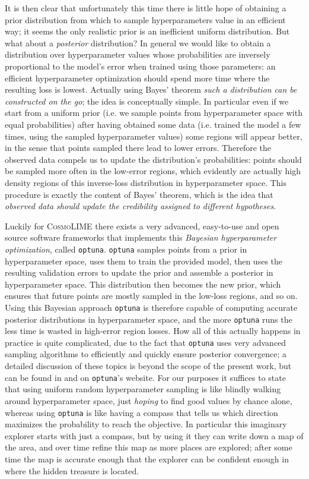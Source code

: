 It is then clear that unfortunately this time there is little hope of obtaining a prior distribution from which to sample hyperparameters value in an efficient way; it seems the only realistic prior is an inefficient uniform distribution. But what about a \emph{posterior} distribution?
In general we would like to obtain a distribution over hyperparameter values whose probabilities are inversely proportional to the model's error when trained using those parameters: an efficient hyperparameter optimization should spend more time where the resulting loss is lowest. Actually using Bayes' theorem \emph{such a distribution can be constructed on the go}; the idea is conceptually simple. In particular even if we start from a uniform prior (i.e. we sample points from hyperparameter space with equal probabilities) after having obtained some data (i.e. trained the model a few times, using the sampled hyperparameter values) some regions will appear better, in the sense that points sampled there lead to lower errors. Therefore the observed data compels us to update the distribution's probabilities: points should be sampled more often in the low-error regions, which evidently are actually high density regions of this inverse-loss distribution in hyperparameter space. This procedure is exactly the content of Bayes' theorem, which is the idea that \emph{observed data should update the credibility assigned to different hypotheses}.

Luckily for \textsc{CosmoLIME} there exists a very advanced, easy-to-use and open source software frameworks that implements this \emph{Bayesian hyperparameter optimization}, called \texttt{optuna}. \cite{optuna}
\texttt{optuna} samples points from a prior in hyperparameter space, uses them to train the provided model, then uses the resulting validation errors to update the prior and assemble a posterior in hyperparameter space. This distribution then becomes the new prior, which ensures that future points are mostly sampled in the low-loss regions, and so on. Using this Bayesian approach \texttt{optuna} is therefore capable of computing accurate posterior distributions in hyperparameter space, and the more \texttt{optuna} runs the less time is wasted in high-error region losses. How all of this actually happens in practice is quite complicated, due to the fact that \texttt{optuna} uses very advanced sampling algorithms to efficiently and quickly ensure posterior convergence; a detailed discussion of these topics is beyond the scope of the present work, but can be found in \cite{optuna} and on \texttt{optuna}'s website.
For our purposes it suffices to state that using uniform random hyperparameter sampling is like blindly walking around hyperparameter space, just \emph{hoping} to find good values by chance alone, whereas using \texttt{optuna} is like having a compass that tells us which direction maximizes the probability to reach the objective. In particular this imaginary explorer starts with just a compass, but by using it they can write down a map of the area, and over time refine this map as more places are explored; after some time the map is accurate enough that the explorer can be confident enough in where the hidden treasure is located.

